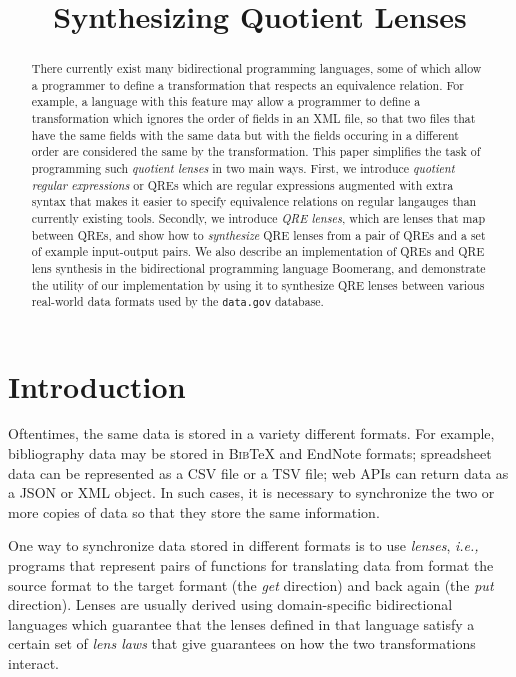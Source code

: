 \documentclass[acmsmall,review,anonymous]{acmart}
\newcommand{\bibtex}{\textsc{Bib}\TeX{}}
\begin{document}
\title{Synthesizing Quotient Lenses}
\begin{abstract}
There currently exist many bidirectional programming languages, some of which
allow a programmer to define a transformation that respects an equivalence
relation. For example, a language with this feature may allow a programmer to
define a transformation which ignores the order of fields in an XML file, so
that two files that have the same fields with the same data but with the fields
occuring in a different order are considered the same by the
transformation. This paper simplifies the task of programming such {\em
quotient lenses} in two main ways. First, we introduce {\em
quotient regular expressions} or QREs which are regular expressions
augmented with extra syntax that makes it easier to specify equivalence
relations on regular langauges than currently existing tools. Secondly, we
introduce {\em QRE lenses}, which are lenses that map between QREs, and show
how to {\em synthesize} QRE lenses from a pair of QREs and a set of example
input-output pairs. We also describe an implementation of QREs and QRE lens
synthesis in the bidirectional programming language Boomerang, and demonstrate
the utility of our implementation by using it to synthesize QRE lenses between
various real-world data formats used by the {\tt data.gov} database.
\end{abstract}

\maketitle

\section{Introduction}
Oftentimes, the same data is stored in a variety different formats. For
example, bibliography data may be stored in \bibtex{} and
EndNote formats; spreadsheet data can be represented as a CSV file
or a TSV file; web APIs can return data as a JSON or XML object. In such cases,
it is necessary to synchronize the two or more copies of data so that they
store the same information.

One way to synchronize data stored in different formats is to use \emph{lenses},
\emph{i.e.,} programs that represent pairs of functions for translating data
from format the source format to the target formant (the \emph{get}
direction) and back again (the \emph{put} direction). Lenses are usually
derived using domain-specific bidirectional languages which guarantee that the
lenses defined in that language satisfy a certain set of \emph{lens laws} that
give guarantees on how the two transformations interact.
\end{document}
